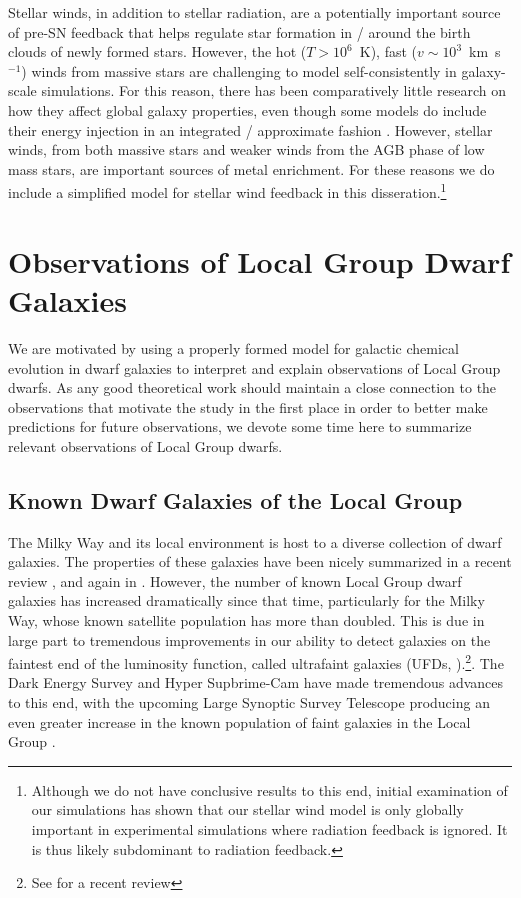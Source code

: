Stellar winds, in addition to stellar radiation, are a potentially important source of pre-SN feedback that helps regulate star formation in / around the birth clouds of newly formed stars. However, the hot ($T>10^{6}$~K), fast ($v \sim 10^{3}$~km~s$^{-1}$) winds from massive stars \citep{Weaver1977} are challenging to model self-consistently in galaxy-scale simulations. For this reason, there has been comparatively little research on how they affect global galaxy properties, even though some models do include their energy injection in an integrated / approximate fashion \citep[e.g.][]{FIRE}. However, stellar winds, from both massive stars and weaker winds from the AGB phase of low mass stars, are important sources of metal enrichment. For these reasons we do include a simplified model for stellar wind feedback in this disseration.\footnote{Although we do not have conclusive results to this end, initial examination of our simulations has shown that our stellar wind model is only globally important in experimental simulations where radiation feedback is ignored. It is thus likely subdominant to radiation feedback.}

\section{Observations of Local Group Dwarf Galaxies}
\label{intro:sec:LG dwarfs}

We are motivated by using a properly formed model for galactic chemical evolution in dwarf galaxies to interpret and explain observations of Local Group dwarfs. As any good theoretical work should maintain a close connection to the observations that motivate the study in the first place in order to better make predictions for future observations, we devote some time here to summarize relevant observations of Local Group dwarfs.

\subsection{Known Dwarf Galaxies of the Local Group}

The Milky Way and its local environment is host to a diverse collection of dwarf galaxies. The properties of these galaxies have been nicely summarized in a recent review \citep{Tolstoy2009}, and again in \cite{McConnachie2012}. However, the number of known Local Group dwarf galaxies has increased dramatically since that time, particularly for the Milky Way, whose known satellite population has more than doubled. This is due in large part to tremendous improvements in our ability to detect galaxies on the faintest end of the luminosity function, called ultrafaint galaxies (UFDs, \cite{Willman2005}).\footnote{See \cite{Simon2019} for a recent review}. The Dark Energy Survey \citep[e.g.][]{Drlica-Wagner2015} and Hyper Supbrime-Cam \citep[e.g.][]{Greco2018} have made tremendous advances to this end, with the upcoming Large Synoptic Survey Telescope producing an even greater increase in the known population of faint galaxies in the Local Group \citep{Haynes2019,Weisz2019}. 


